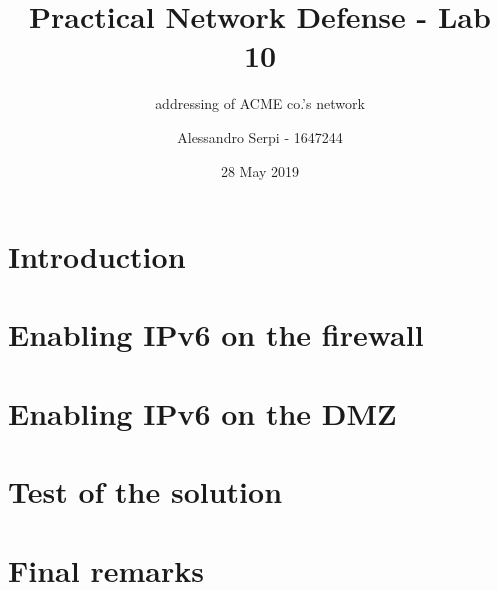 \documentclass[draft]{homework}
\title{Practical Network Defense - Lab 10}
\subtitle{\ip addressing of ACME co.’s network}
\author{Alessandro Serpi - 1647244}
\date{28 May 2019}
\newcommand{\ip}{IPv6\xspace}
\begin{document}
    \maketitle
    \tableofcontents
    
    
    \pagebreak
    \section{Introduction}
    
    
    \section{Enabling \ip on the firewall}
    
    
    \section{Enabling \ip on the DMZ}
    
    
    \section{Test of the solution}
    
    
    \section{Final remarks}
\end{document}

